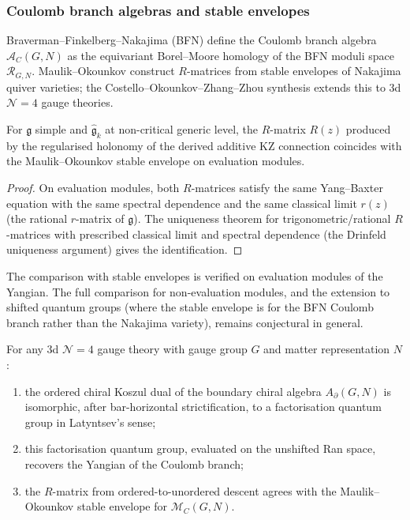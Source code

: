 \subsubsection*{Coulomb branch algebras and stable envelopes}

Braverman--Finkelberg--Nakajima (BFN) define the Coulomb branch algebra
$\mathcal{A}_C(G,N)$ as the equivariant Borel--Moore homology of the BFN
moduli space $\mathcal{R}_{G,N}$. Maulik--Okounkov construct $R$-matrices
from stable envelopes of Nakajima quiver varieties; the
Costello--Okounkov--Zhang--Zhou synthesis extends this to 3d
$\mathcal{N}=4$ gauge theories.

\begin{proposition}
\label{prop:r-matrix-stable-envelope}
For $\mathfrak{g}$ simple and $\widehat{\mathfrak{g}}_k$ at
non-critical generic level, the $R$-matrix $R(z)$ produced by the
regularised holonomy of the derived additive KZ connection coincides
with the Maulik--Okounkov stable envelope on evaluation modules.
\end{proposition}

\begin{proof}
On evaluation modules, both $R$-matrices satisfy the same
Yang--Baxter equation with the same spectral dependence and the
same classical limit $r(z)$ (the rational $r$-matrix of
$\mathfrak{g}$). The uniqueness theorem for trigonometric/rational
$R$-matrices with prescribed classical limit and spectral dependence
(the Drinfeld uniqueness argument) gives the identification.
\end{proof}

\begin{remark}
The comparison with stable envelopes is verified on evaluation modules
of the Yangian. The full comparison for non-evaluation modules,
and the extension to shifted quantum groups (where the stable
envelope is for the BFN Coulomb branch rather than the Nakajima
variety), remains conjectural in general.
\end{remark}

\begin{conjecture}
\ClaimStatusConjectured
\label{conj:three-language-equivalence}
For any 3d $\mathcal{N}=4$ gauge theory with gauge group $G$ and
matter representation $N$:
\begin{enumerate}[label=\textup{(\alph*)}]
\item the ordered chiral Koszul dual of the boundary chiral algebra
 $A_{\partial}(G,N)$ is isomorphic, after bar-horizontal
 strictification, to a factorisation quantum group in Latyntsev's sense;
\item this factorisation quantum group, evaluated on the unshifted Ran
 space, recovers the Yangian of the Coulomb branch;
\item the $R$-matrix from ordered-to-unordered descent agrees with the
 Maulik--Okounkov stable envelope for $\mathcal{M}_C(G,N)$.
\end{enumerate}
\end{conjecture}

